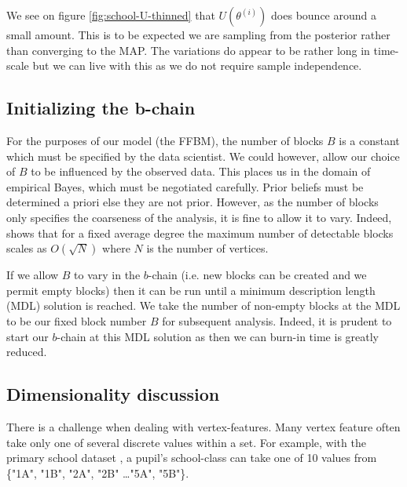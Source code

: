 We see on figure \ref{fig:school-U-thinned} that $U(\theta^{(i)})$ does bounce around a small amount. This is to be expected we are sampling from the posterior rather than converging to the MAP. The variations do appear to be rather long in time-scale but we can live with this as we do not require sample independence.
\FloatBarrier
\subsection{Initializing the b-chain}

For the purposes of our model (the FFBM), the number of blocks $B$ is a constant which must be specified by the data scientist. We could however, allow our choice of $B$ to be influenced by the observed data. This places us in the domain of empirical Bayes, which must be negotiated carefully. Prior beliefs must be determined a priori else they are not prior. However, as the number of blocks only specifies the coarseness of the analysis, it is fine to allow it to vary. Indeed, \citet{peixoto-determine-B} shows that for a fixed average degree the maximum number of detectable blocks scales as $O(\sqrt{N})$ where $N$ is the number of vertices.

If we allow $B$ to vary in the $b$-chain (i.e. new blocks can be created and we permit empty blocks) then it can be run  until a minimum description length (MDL) solution is reached. We take the number of non-empty blocks at the MDL to be our fixed block number $B$ for subsequent analysis. Indeed, it is prudent to start our $b$-chain at this MDL solution as then we can burn-in time is greatly reduced.

\subsection{Dimensionality discussion}
\label{appdx:dimension}

There is a challenge when dealing with vertex-features. Many vertex feature often take only one of several discrete values within a set. For example, with the primary school dataset \cite{schools}, a pupil's school-class can take one of 10 values from \{"1A", "1B", "2A", "2B" \dots "5A", "5B"\}.

